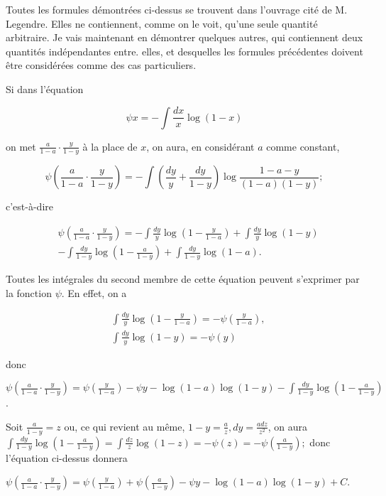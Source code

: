 \documentclass{article}
\begin{document}
Toutes les formules démontrées ci-dessus se trouvent dans l'ouvrage cité de M. Legendre. Elles ne contiennent, comme on le voit, qu'une seule quantité arbitraire. Je vais maintenant en démontrer quelques autres, qui contiennent deux quantités indépendantes entre. elles, et desquelles les formules précédentes doivent être considérées comme des cas particuliers.

Si dans l'équation

\[
\psi x=-\int \frac{d x}{x} \log (1-x)
\]

on met \(\frac{a}{1-a} \cdot \frac{y}{1-y}\) à la place de \(x\), on aura, en considérant \(a\) comme constant,

\[
\psi\left(\frac{a}{1-a} \cdot \frac{y}{1-y}\right)=-\int\left(\frac{d y}{y}+\frac{d y}{1-y}\right) \log \frac{1-a-y}{(1-a)(1-y)} ;
\]

c'est-à-dire

\[
\begin{aligned}
& \psi\left(\frac{a}{1-a} \cdot \frac{y}{1-y}\right)=-\int \frac{d y}{y} \log \left(1-\frac{y}{1-a}\right)+\int \frac{d y}{y} \log (1-y) \\
&-\int \frac{d y}{1-y} \log \left(1-\frac{a}{1-y}\right)+\int \frac{d y}{1-y} \log (1-a) .
\end{aligned}
\]

Toutes les intégrales du second membre de cette équation peuvent s'exprimer par la fonction \(\psi\). En effet, on a

\[
\begin{aligned}
& \int \frac{d y}{y} \log \left(1-\frac{y}{1-a}\right)=-\psi\left(\frac{y}{1-a}\right), \\
& \int \frac{d y}{y} \log (1-y)=-\psi(y)
\end{aligned}
\]

donc

\(\psi\left(\frac{a}{1-a} \cdot \frac{y}{1-y}\right)=\psi\left(\frac{y}{1-a}\right)-\psi y-\log (1-a) \log (1-y)-\int \frac{d y}{1-y} \log \left(1-\frac{a}{1-y}\right)\).

Soit \(\frac{a}{1-y}=z\) ou, ce qui revient au même, \(1-y=\frac{a}{z}, d y=\frac{a d z}{z^{2}}\), on aura \(\int \frac{d y}{1-y} \log \left(1-\frac{a}{1-y}\right)=\int \frac{d z}{z} \log (1-z)=-\psi(z)=-\psi\left(\frac{a}{1-y}\right) ;\) donc l'équation ci-dessus donnera

\(\psi\left(\frac{a}{1-a} \cdot \frac{y}{1-y}\right)=\psi\left(\frac{y}{1-a}\right)+\psi\left(\frac{a}{1-y}\right)-\psi y-\log (1-a) \log (1-y)+C\).
\end{document}
